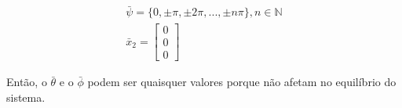 \documentclass[10pt]{article}
\begin{document}
\begin{equation}
\begin{gathered}
    \bar\psi = \{0,\pm\pi,\pm 2\pi,...,\pm n\pi\}, n \in \mathbb{N} \\
    \bar{x}_2 =
    \begin{bmatrix}
        0 \\
        0 \\
        0
    \end{bmatrix}
\end{gathered}
\end{equation}

Então, o $\bar\theta$ e o $\bar\phi$ podem ser quaisquer valores porque não afetam no equilíbrio do sistema.
\end{document}
